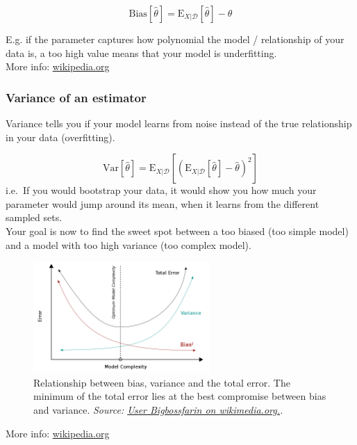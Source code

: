 \documentclass[
]{book}
\begin{document}
\[\text{Bias}[\hat{\theta}]=\text{E}_{X|\mathcal{D}}[\hat{\theta}]- \theta\]

E.g. if the parameter captures how polynomial the model / relationship
of your data is, a too high value means that your model is
underfitting.\\

More info:
\href{https://en.wikipedia.org/wiki/Bias_of_an_estimator}{wikipedia.org}

\hypertarget{variance-of-an-estimator}{%
\subsubsection{Variance of an estimator}\label{variance-of-an-estimator}}

Variance tells you if your model learns from noise instead of the true
relationship in your data (overfitting).

\[\text{Var}[\hat{\theta}]=\text{E}_{X|\mathcal{D}}[(\text{E}_{X|\mathcal{D}}[\hat{\theta}]- \hat{\theta})^2]\]
i.e.~If you would bootstrap your data, it would show you how much your
parameter would jump around its mean, when it learns from the different
sampled sets.\\

Your goal is now to find the sweet spot between a too biased (too simple
model) and a model with too high variance (too complex model).\\

\begin{figure}
\centering
\includegraphics[width=0.6\textwidth,height=\textheight]{figures/Bias_and_variance_contributing_to_total_error.png}
\caption{Relationship between bias, variance and the total error. The minimum
of the total error lies at the best compromise between bias and
variance. \emph{Source: \href{https://commons.wikimedia.org/wiki/File:Bias_and_variance_contributing_to_total_error.svg}{User Bigbossfarin on
wikimedia.org.}.}}
\end{figure}

More info:
\href{https://en.wikipedia.org/wiki/Bias\%E2\%80\%93variance_tradeoff}{wikipedia.org}
\end{document}
